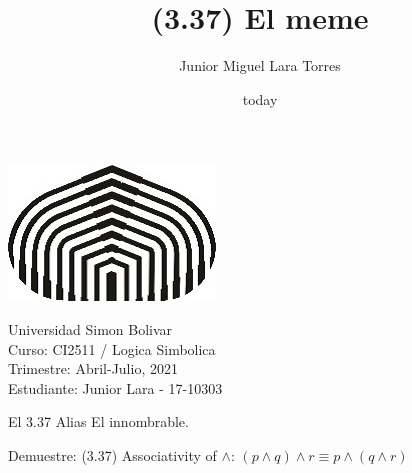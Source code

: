 \documentclass[a4paper,12pt]{article}
\title{(3.37) El meme}
\author{Junior Miguel Lara Torres}
\date{today}
\begin{document}
\begin{center}
\par \includegraphics[scale=1]{USB} \par
Universidad Simon Bolivar \\ Curso: CI2511 / Logica Simbolica \\ Trimestre: Abril-Julio, 2021 \\ Estudiante: Junior Lara - 17-10303 \\
\end{center}

\begin{center}
El 3.37 Alias El innombrable.
\end{center}

Demuestre: (3.37) Associativity of $\wedge$: $(p \wedge q)\wedge r \equiv p \wedge (q \wedge r)$  \\
\end{document}

